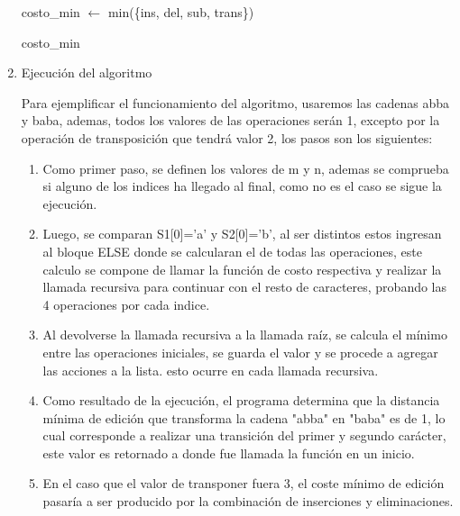 \begin{enumerate}[1)]
\begin{algorithm}[H]
{{            
        }
    
        costo\_min $\leftarrow$ min(\{ins, del, sub, trans\})\;
    
        \Return costo\_min\;
    }


\end{algorithm}

\item Ejecución del algoritmo

Para ejemplificar el funcionamiento del algoritmo, usaremos las cadenas
abba y baba, ademas, todos los valores de las operaciones serán 1, excepto
por la operación de transposición que tendrá valor 2, los pasos son los siguientes:


\begin{enumerate}[1)]
    \item Como primer paso, se definen los valores de m y n, ademas se comprueba si alguno de los 
indices ha llegado al final, como no es el caso se sigue la ejecución.

\item Luego, se comparan S1[0]='a' y S2[0]='b', al ser distintos estos ingresan al bloque ELSE 
donde se calcularan el de todas las operaciones, este calculo se compone de llamar la función de costo 
respectiva y realizar la llamada recursiva para continuar con el resto de caracteres, 
probando las 4 operaciones por cada indice.

\item Al devolverse la llamada recursiva a la llamada raíz, se calcula el mínimo
entre las operaciones iniciales, se guarda el valor y se procede a agregar las
acciones a la lista. esto ocurre en cada llamada recursiva.

\item Como resultado de la ejecución, el programa determina que la distancia mínima de edición
que transforma la cadena "abba" en "baba" es de 1, lo cual corresponde a realizar una
transición del primer y segundo carácter, este valor es retornado a donde fue llamada
la función en un inicio.

\item En el caso que el valor de transponer fuera 3, el coste mínimo de edición
pasaría a ser producido por la combinación de inserciones y eliminaciones.

\end{enumerate}


\end{enumerate}
